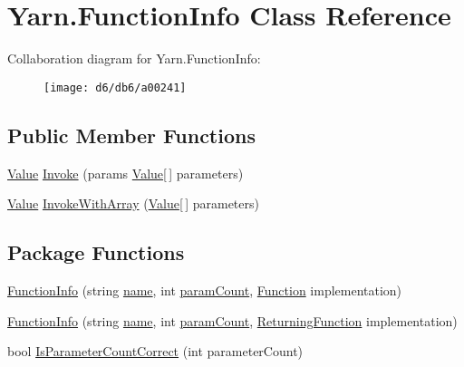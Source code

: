 \hypertarget{a00041}{\section{Yarn.\-Function\-Info Class Reference}
\label{a00041}
}


Collaboration diagram for Yarn.\-Function\-Info\-:
\nopagebreak
\begin{figure}[H]
\begin{center}
\leavevmode
\texttt{[image: d6/db6/a00241]}
\end{center}
\end{figure}
\subsection*{Public Member Functions}
\begin{DoxyCompactItemize}
\item 
\hyperlink{a00086}{Value} \hyperlink{a00041_ab400ac66785d7df2e3fc0f3ce3796044}{Invoke} (params \hyperlink{a00086}{Value}\mbox{[}$\,$\mbox{]} parameters)
\item 
\hyperlink{a00086}{Value} \hyperlink{a00041_a3ce11058d35232907a738de4bb094c67}{Invoke\-With\-Array} (\hyperlink{a00086}{Value}\mbox{[}$\,$\mbox{]} parameters)
\end{DoxyCompactItemize}
\subsection*{Package Functions}
\begin{DoxyCompactItemize}
\item 
\hyperlink{a00041_a93457cd0e838cb2ef59cc2a3a46ce758}{Function\-Info} (string \hyperlink{a00041_adb38e83e3c1597b553aeff14bef5bfcb}{name}, int \hyperlink{a00041_aa8527de9e4f153b05164ccaf167c3186}{param\-Count}, \hyperlink{a00026_ae0be2e5cf13d5779816102439e61ff1a}{Function} implementation)
\item 
\hyperlink{a00041_a41d97c09da25caede70cb734d18113b9}{Function\-Info} (string \hyperlink{a00041_adb38e83e3c1597b553aeff14bef5bfcb}{name}, int \hyperlink{a00041_aa8527de9e4f153b05164ccaf167c3186}{param\-Count}, \hyperlink{a00026_a5177bf74fbfe7303fac9d8236c2e514b}{Returning\-Function} implementation)
\item 
bool \hyperlink{a00041_a1ed09ff8aafa230a0d2bbc23cd6cd763}{Is\-Parameter\-Count\-Correct} (int parameter\-Count)
\end{DoxyCompactItemize}
